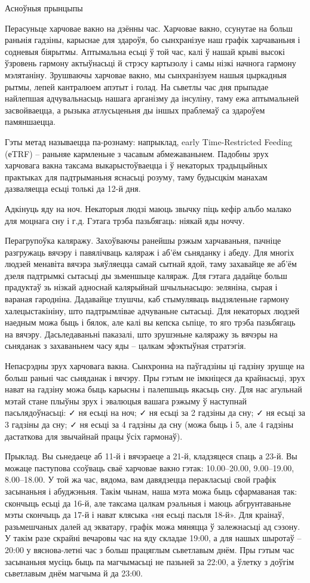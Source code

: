 Асноўныя прынцыпы

Перасуньце харчовае вакно на дзённы час.
Харчовае вакно, ссунутае на больш раньнія гадзіны, карыснае для здароўя, бо сынхранізуе наш графік харчаваньня і содневыя біярытмы. Аптымальна есьці ў той час, калі ў нашай крыві высокі ўзровень гармону актыўнасьці й стрэсу картызолу і самы нізкі начнога гармону мэлятаніну. Зрушваючы харчовае вакно, мы сынхранізуем нашыя цыркадныя рытмы, лепей кантралюем апэтыт і голад. На сьветлы час дня прыпадае найлепшая адчувальнасьць нашага арганізму да інсуліну, таму ежа аптымальней засвойваецца, а рызыка атлусьценьня ды іншых праблемаў са здароўем памяншаецца.

Гэты метад называецца па-рознаму: напрыклад, early Time-Restricted Feeding (еTRF) – раньняе кармленьне з часавым абмежаваньнем. Падобны зрух харчовага вакна таксама выкарыстоўваецца і ў некаторых традыцыйных практыках для падтрыманьня яснасьці розуму, таму будысцкім манахам дазваляецца есьці толькі да 12-й дня.

Адкінуць яду на ноч.
Некаторыя людзі маюць звычку піць кефір альбо малако для моцнага сну і г.д. Гэтага трэба пазьбягаць: ніякай яды ноччу.

Перагрупоўка каляражу.
Захоўваючы ранейшы рэжым харчаваньня, пачніце разгружаць вячэру і павялічваць каляраж і аб'ём сьняданку і абеду. Для многіх людзей менавіта вячэра зьяўляецца самай сытнай ядой, таму захавайце яе аб'ём дзеля падтрымкі сытасьці ды зьменшыце каляраж. Для гэтага дадайце больш прадуктаў зь нізкай адноснай калярыйнай шчыльнасьцю: зеляніна, сырая і вараная гародніна. Дадавайце тлушчы, каб стымуляваць выдзяленьне гармону халецыстакініну, што падтрымлівае адчуваньне сытасьці. Для некаторых людзей наедным можа быць і бялок, але калі вы кепска сьпіце, то яго трэба пазьбягаць на вячэру. Дасьледаваньні паказалі, што зрушэньне каляражу зь вячэры на сьняданак з захаваньнем часу яды – цалкам эфэктыўная стратэгія.

Непасрэдны зрух харчовага вакна.
Сынхронна на паўгадзіны ці гадзіну зрушце на больш раньні час сьняданак і вячэру. Пры гэтым не імкніцеся да крайнасьці, зрух нават на гадзіну можа быць карысны і палепшыць якасьць сну. Для нас агульнай мэтай стане плыўны зрух і эвалюцыя вашага рэжыму ў наступнай пасьлядоўнасьці:
✓ ня есьці на ноч;
✓ ня есьці за 2 гадзіны да сну;
✓ ня есьці за 3 гадзіны да сну;
✓ ня есьці за 4 гадзіны да сну (можа быць і 5, але 4 гадзіны дастаткова для звычайнай працы ўсіх гармонаў).

Прыклад.
Вы сьнедаеце аб 11-й і вячэраеце а 21-й, кладзяцеся спаць а 23-й. Вы можаце паступова ссоўваць сваё харчовае вакно гэтак: 10.00–20.00, 9.00–19.00, 8.00–18.00. У той жа час, вядома, вам давядзецца перакласьці свой графік засынаньня і абуджэньня.
Такім чынам, наша мэта можа быць сфармаваная так: скончыць есьці да 16-й, але таксама цалкам рэальныя і маюць абгрунтаваньне мэты скончыць да 17-й і нават клясыка «ня есьці пасьля 18-й». Для краінаў, разьмешчаных далей ад экватару, графік можа мяняцца ў залежнасьці ад сэзону. У такім разе скрайні вечаровы час на яду складае 19:00, а для нашых шыротаў – 20:00 у вяснова-летні час з больш працяглым сьветлавым днём. Пры гэтым час засынаньня мусіць быць па магчымасьці не пазьней за 22:00, а ўлетку з доўгім сьветлавым днём магчыма й да 23:00.

